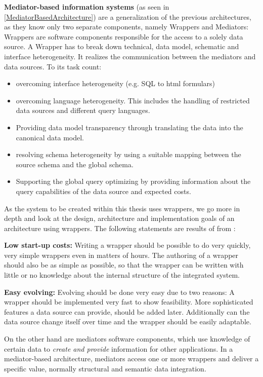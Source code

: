 \textbf{Mediator-based information systems} (as seen in \ref{MediatorBasedArchitecture}) are a generalization of the previous architectures, as they know only two separate components, namely Wrappers and Mediators: Wrappers are software components responsible for the access to a solely data source. A Wrapper has to break down technical, data model, schematic and interface heterogeneity. It realizes the communication between the mediators and data sources. To its task count:
\begin{itemize}
\item overcoming interface heterogeneity (e.g. SQL to html formulars)
\item overcoming language heterogeneity. This includes the handling of restricted data sources and different query languages.
\item Providing data model transparency through translating the data into the canonical data model.
\item resolving schema heterogeneity by using a suitable mapping between the source schema and the global schema.
\item Supporting the global query optimizing by providing information about the query capabilities of the data source and expected costs.
\end{itemize}

As the system to be created within this thesis uses wrappers, we go more in depth and look at the design, architecture and implementation goals of an architecture using wrappers. The following statements are results of from \cite{Roth:1997:DSW:645923.670992}:


\textbf{Low start-up costs:} Writing a wrapper should be possible to do very quickly, very simple wrappers even in matters of hours. The authoring of a wrapper should also be as simple as possible, so that the wrapper can be written with little or no knowledge about the internal structure of the integrated system.

\textbf{Easy evolving:} Evolving should be done very easy due to two reasons: A wrapper should be implemented very fast to show feasibility. More sophisticated features a data source can provide, should be added later. Additionally can the data source change  itself over time and the wrapper should be easily adaptable. 


On the other hand are mediators software components, which use knowledge of certain data to \textit{create and provide} information for other applications. In a mediator-based architecture, mediators access one or more wrappers and deliver a specific value, normally structural and semantic data integration.

